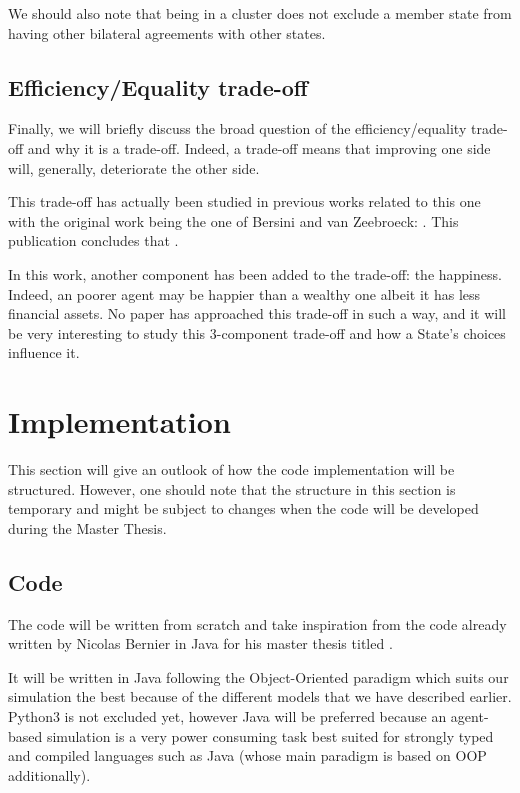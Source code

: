 \documentclass[12pt]{article}
\begin{document}
    We should also note that being in a cluster does not exclude a member state from having other bilateral agreements with other states.

\subsection{Efficiency/Equality trade-off}
    Finally, we will briefly discuss the broad question of the efficiency/equality trade-off and why it is a trade-off. Indeed, a trade-off means that improving one side will, generally, deteriorate the other side.
    
    This trade-off has actually been studied in previous works related to this one with the original work being the one of Bersini and van Zeebroeck: . This publication concludes that  \cite{bersini}.
    
    In this work, another component has been added to the trade-off: the happiness. Indeed, an poorer agent may be happier than a wealthy one albeit it has less financial assets. No paper has approached this trade-off in such a way, and it will be very interesting to study this 3-component trade-off and how a State's choices influence it.


\section{Implementation}\label{section:implementation}

This section will give an outlook of how the code implementation will be structured. However, one should note that the structure in this section is temporary and might be subject to changes when the code will be developed during the Master Thesis.

\subsection{Code}
The code will be written from scratch and take inspiration from the code already written by Nicolas Bernier in Java for his master thesis titled  \cite{nicolasbernier}.

It will be written in Java following the Object-Oriented paradigm which suits our simulation the best because of the different models that we have described earlier. Python3 is not excluded yet, however Java will be preferred because an agent-based simulation is a very power consuming task best suited for strongly typed and compiled languages such as Java (whose main paradigm is based on OOP additionally).
\end{document}
